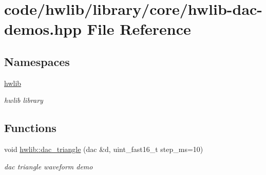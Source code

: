 \hypertarget{hwlib-dac-demos_8hpp}{}\section{code/hwlib/library/core/hwlib-\/dac-\/demos.hpp File Reference}
\label{hwlib-dac-demos_8hpp}
\subsection*{Namespaces}
\begin{DoxyCompactItemize}
\item 
 \hyperlink{namespacehwlib}{hwlib}
\begin{DoxyCompactList}\small\item\em hwlib library \end{DoxyCompactList}\end{DoxyCompactItemize}
\subsection*{Functions}
\begin{DoxyCompactItemize}
\item 
void \hyperlink{namespacehwlib_a25454b1b1a7ef5887e55704c3b2fe5b0}{hwlib\+::dac\+\_\+triangle} (dac \&d, uint\+\_\+fast16\+\_\+t step\+\_\+ms=10)
\begin{DoxyCompactList}\small\item\em dac triangle waveform demo \end{DoxyCompactList}\end{DoxyCompactItemize}
